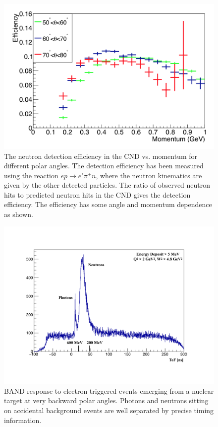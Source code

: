 \documentclass[final,3p,twocolumn]{elsarticle}
\begin{document}
\begin{figure}[th!]
\centerline{\includegraphics[width=1.0\columnwidth]{cnd-neutron-efficiency.png}}
\caption{The neutron detection efficiency in the CND vs. momentum for different polar angles. The detection efficiency
  has been measured using the reaction $e p \to e' \pi^+ n$, where the neutron kinematics are given by the other
  detected particles. The ratio of observed neutron hits to predicted neutron hits in the CND gives the detection
  efficiency. The efficiency has some angle and momentum dependence as shown.} 
\label{CND-neutron-efficiency}
\end{figure} 

\begin{figure}[th!]
\centerline{\includegraphics[width=1.2\columnwidth]{BAND-performance.pdf}}
\caption{BAND response to electron-triggered events emerging from a nuclear target at very backward polar angles.
  Photons and neutrons sitting on accidental background events are well separated by precise timing information.} 
\label{BAND-performance}
\end{figure} 
\end{document}
